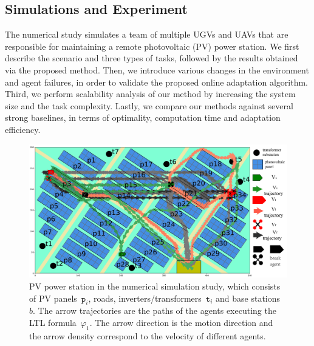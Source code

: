 \subsection{Simulations and Experiment}\label{subsec:simulation}


The numerical study simulates a team of multiple UGVs and UAVs
that are responsible for maintaining a remote photovoltaic (PV) power station.
We first describe the scenario and three types of tasks,
followed by the results obtained via the proposed method.
Then, we introduce various changes in the environment and agent failures,
in order to validate the proposed online adaptation algorithm.
Third, we perform scalability analysis of our method by increasing
the system size and the task complexity.
Lastly, we compare our methods against several strong baselines, in terms of
optimality, computation time and adaptation efficiency.


\begin{figure}
\includegraphics[scale=0.18]{figures/background3.pdf}
\caption{PV power station in the numerical simulation study,
  which consists of PV panels~$\texttt{p}_i$, roads,
  inverters/transformers~$\texttt{t}_i$ and base stations~$b$.
  The arrow trajectories are the paths of the agents 
  executing the LTL formula~$\varphi_{1}$. The arrow direction
  is the motion direction and the arrow density correspond to the velocity of different agents.}
\label{fig:workspace}
\end{figure}


